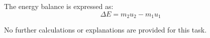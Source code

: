 The energy balance is expressed as:  
\[
\Delta E = m_{2} u_{2} - m_{1} u_{1}
\]  

No further calculations or explanations are provided for this task.
